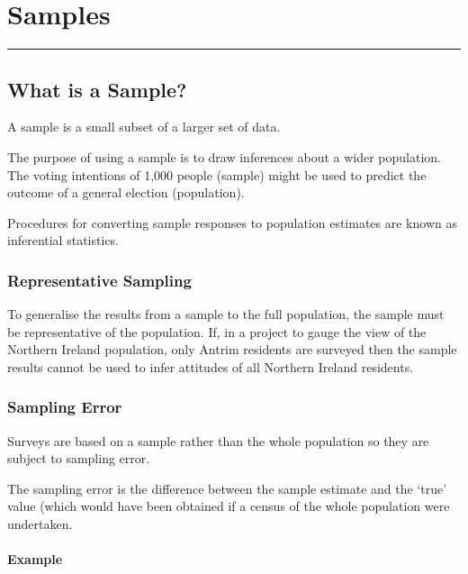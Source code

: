 \documentclass[
]{book}
\begin{document}
\hypertarget{samples}{%
\chapter{Samples}\label{samples}}

\begin{center}\rule{0.5\linewidth}{0.5pt}\end{center}

\hypertarget{what-is-a-sample}{%
\section{What is a Sample?}\label{what-is-a-sample}}

A sample is a small subset of a larger set of data.

The purpose of using a sample is to draw inferences about a wider population. The voting intentions of 1,000 people (sample) might be used to predict the outcome of a general election (population).

Procedures for converting sample responses to population estimates are known as inferential statistics.

\hypertarget{representative-sampling}{%
\subsection{Representative Sampling}\label{representative-sampling}}

To generalise the results from a sample to the full population, the sample must be representative of the population. If, in a project to gauge the view of the Northern Ireland population, only Antrim residents are surveyed then the sample results cannot be used to infer attitudes of all Northern Ireland residents.

\hypertarget{sampling-error}{%
\subsection{Sampling Error}\label{sampling-error}}

Surveys are based on a sample rather than the whole population so they are subject to sampling error.

The sampling error is the difference between the sample estimate and the `true' value (which would have been obtained if a census of the whole population were undertaken.

\hypertarget{example-13}{%
\subsubsection{Example}\label{example-13}}
\end{document}
